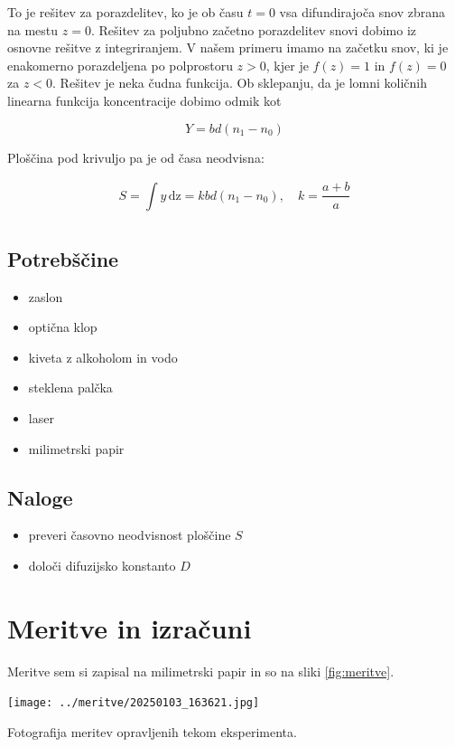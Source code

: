 \documentclass[11pt]{article}
\begin{document}
To je rešitev za porazdelitev, ko je ob času \(t = 0\) vsa difundirajoča snov zbrana na mestu \(z=0\). Rešitev za poljubno začetno porazdelitev snovi dobimo iz osnovne rešitve z integriranjem. V našem primeru imamo na začetku snov, ki je enakomerno porazdeljena po polprostoru \(z > 0\), kjer je \(f(z) = 1\) in \(f(z) = 0\) za \(z< 0\). Rešitev je neka čudna funkcija. Ob sklepanju, da je lomni količnih linearna funkcija koncentracije dobimo odmik kot

\begin{equation}
\label{eq:5}
Y = bd (n_1 - n_0)
\end{equation}

Ploščina pod krivuljo pa je od časa neodvisna:

\begin{equation}
\label{eq:6}
S = \int\limits_{}^{} y \,\mathrm{d z} = kbd(n_1 - n_0), \quad k = \frac{a + b}{a}
\end{equation}

\subsection{Potrebščine}\label{sec:orgbc5db6b}
\begin{itemize}
\item zaslon
\item optična klop
\item kiveta z alkoholom in vodo
\item steklena palčka
\item laser
\item milimetrski papir
\end{itemize}

\subsection{Naloge}\label{sec:orga510493}
\begin{itemize}
\item preveri časovno neodvisnost ploščine \(S\)
\item določi difuzijsko konstanto \(D\)
\end{itemize}
\section{Meritve in izračuni}\label{sec:org161f0a0}

Meritve sem si zapisal na milimetrski papir in so na sliki \ref{fig:meritve}.

\begin{slika}[H]
  \centering
  \texttt{[image: ../meritve/20250103\_163621.jpg]}
  \caption{\small Fotografija meritev opravljenih tekom eksperimenta.}
  \end{slika}
\end{document}
